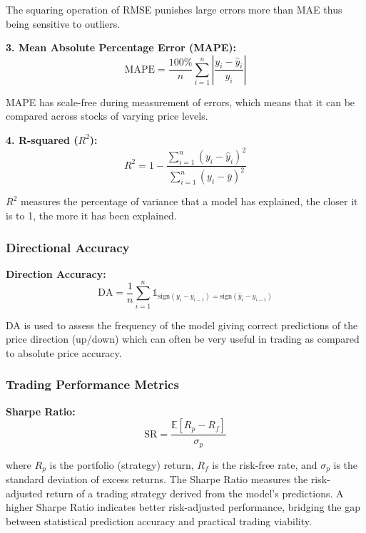 The squaring operation of RMSE punishes large errors more than MAE thus being sensitive to outliers.

\textbf{3. Mean Absolute Percentage Error (MAPE):}
\begin{equation}
\text{MAPE} = \frac{100\%}{n} \sum_{i=1}^{n} \left|\frac{y_i - \hat{y}_i}{y_i}\right|
\end{equation}

MAPE has scale-free during measurement of errors, which means that it can be compared across stocks of varying price levels.

\textbf{4. R-squared ($R^2$):}
\begin{equation}
R^2 = 1 - \frac{\sum_{i=1}^{n}(y_i - \hat{y}_i)^2}{\sum_{i=1}^{n}(y_i - \bar{y})^2}
\end{equation}

$R^2$ measures the percentage of variance that a model has explained, the closer it is to 1, the more it has been explained.

\subsubsection{Directional Accuracy}

\textbf{Direction Accuracy:}
\begin{equation}
\text{DA} = \frac{1}{n} \sum_{i=1}^{n} \mathbb{1}_{\text{sign}(y_i - y_{i-1}) = \text{sign}(\hat{y}_i - y_{i-1})}
\end{equation}

DA is used to assess the frequency of the model giving correct predictions of the price direction (up/down) which can often be very useful in trading as compared to absolute price accuracy.

\subsubsection{Trading Performance Metrics}

\textbf{Sharpe Ratio:}
\begin{equation}
\text{SR} = \frac{\mathbb{E}[R_p - R_f]}{\sigma_p}
\end{equation}

where $R_p$ is the portfolio (strategy) return, $R_f$ is the risk-free rate, and $\sigma_p$ is the standard deviation of excess returns. The Sharpe Ratio measures the risk-adjusted return of a trading strategy derived from the model's predictions. A higher Sharpe Ratio indicates better risk-adjusted performance, bridging the gap between statistical prediction accuracy and practical trading viability.

